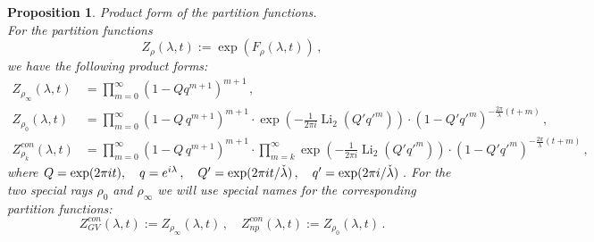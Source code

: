 \documentclass[a4paper,12pt,justification=centering]{article}
\numberwithin{equation}{section}
\newcommand{\ii}{\textnormal{i}}
\theoremstyle{plain}%
\newtheorem{prop}[thm]{Proposition}
\theoremstyle{definition}
\begin{document}
\begin{prop}{Product form of the partition functions.}\label{prop:prod}\\
For the partition functions $$Z_{\rho}(\lambda,t):=\exp (F_{\rho}(\lambda,t))\,,$$ we have the following product forms:
\begin{align}
Z_{\rho_{\infty}} (\lambda,t)&= \prod_{m=0}^{\infty} (1- Q q^{m+1})^{m+1}\, , \\
 Z_{\rho_{0}} (\lambda,t) &= \prod_{m=0}^{\infty} (1-Q\, q^{m+1})^{m+1}  \cdot \exp\left(-\frac{1}{2\pi i} \operatorname{Li}_2(Q' q'^m)\right) \cdot (1-Q' q'^m)^{-\frac{2\pi}{\lambda}\left( t+m\right)}\,,\\
Z^{con}_{\rho_k}(\lambda,t)& = \prod_{m=0}^{\infty} (1-Q\, q^{m+1})^{m+1}  \cdot \prod_{m=k}^{\infty} \exp\left(-\frac{1}{2\pi i} \operatorname{Li}_2(Q' q'^m)\right) \cdot (1-Q' q'^m)^{-\frac{2\pi}{\lambda}\left( t+m\right)}\,,
\end{align}
where $Q=\exp(2\pi i t),\quad q=e^{\ii\lambda}\,, \quad Q'=\exp(2\pi i t/\check{\lambda})\,, \quad q'=\exp(2\pi i/\check{\lambda})$\,. For the two special rays $\rho_0$ and $\rho_{\infty}$ we will use special names for the corresponding partition functions:
$$  Z^{con}_{GV}(\lambda,t):= Z_{\rho_{\infty}} (\lambda,t) \, , \quad  Z^{con}_{np}(\lambda,t):= Z_{\rho_{0}} (\lambda,t)\,.$$
\end{prop}
\end{document}
